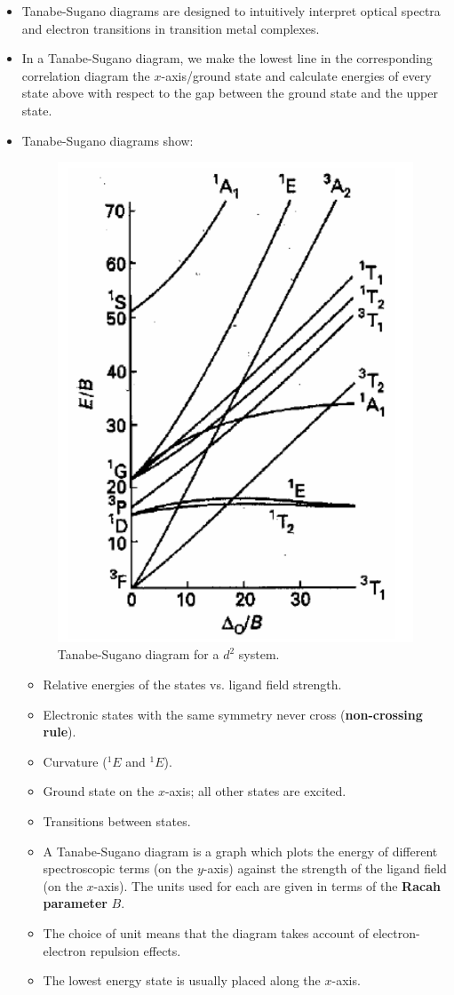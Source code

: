 \documentclass[../notes.tex]{subfiles}
\begin{document}
\begin{itemize}
    \item Tanabe-Sugano diagrams are designed to intuitively interpret optical spectra and electron transitions in transition metal complexes.
    \item In a Tanabe-Sugano diagram, we make the lowest line in the corresponding correlation diagram the $x$-axis/ground state and calculate energies of every state above with respect to the gap between the ground state and the upper state.
    \item Tanabe-Sugano diagrams show:
    \begin{figure}[h!]
        \centering
        \includegraphics[width=0.35\linewidth]{../ExtFiles/tanabeSugano-d2.png}
        \caption{Tanabe-Sugano diagram for a $d^2$ system.}
        \label{fig:tanabeSugano-d2}
    \end{figure}
    \begin{itemize}
        \item Relative energies of the states vs. ligand field strength.
        \item Electronic states with the same symmetry never cross (\textbf{non-crossing rule}).
        \item Curvature (${}^1E$ and ${}^1E$).
        \item Ground state on the $x$-axis; all other states are excited.
        \item Transitions between states.
        \item A Tanabe-Sugano diagram is a graph which plots the energy of different spectroscopic terms (on the $y$-axis) against the strength of the ligand field (on the $x$-axis). The units used for each are given in terms of the \textbf{Racah parameter} $B$.
        \item The choice of unit means that the diagram takes account of electron-electron repulsion effects.
        \item The lowest energy state is usually placed along the $x$-axis.

\end{itemize}
\end{itemize}
\end{document}
